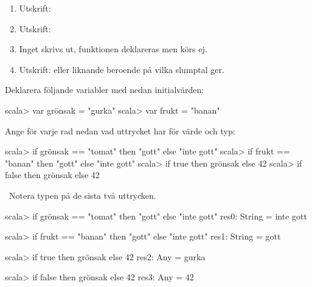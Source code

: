 \TaskSolved \what

\begin{enumerate}
\item Utskrift: 
\item Utskrift: 
\item Inget skrivs ut, funktionen deklareras men körs ej.
\item Utskrift:  eller liknande beroende på vilka slumptal  ger.
\end{enumerate}

\QUESTEND





\QUESTBEGIN

\Task  Deklarera följande variabler med nedan initialvärden:

\begin{REPLnonum}
scala> var grönsak = "gurka"
scala> var frukt = "banan"
\end{REPLnonum}

Ange för varje rad nedan vad uttrycket har för värde och typ:
\begin{REPLnonum}
scala> if grönsak == "tomat" then "gott" else "inte gott"
scala> if frukt == "banan" then "gott" else "inte gott"
scala> if true then grönsak else 42
scala> if false then grönsak else 42
\end{REPLnonum}

\SOLUTION


\TaskSolved \what~Notera typen  på de sista två uttrycken.

\begin{REPLnonum}
scala> if grönsak == "tomat" then "gott" else "inte gott"
res0: String = inte gott

scala> if frukt == "banan" then "gott" else "inte gott"
res1: String = gott

scala> if true then grönsak else 42
res2: Any = gurka

scala> if false then grönsak else 42
res3: Any = 42
\end{REPLnonum}


\QUESTEND






\QUESTBEGIN

\Task \what

